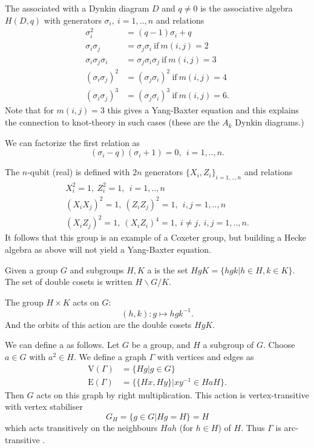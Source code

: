 \documentclass[12pt]{article}
\begin{document}
The  associated with a Dynkin diagram $D$
and $q\ne 0$ 
is the associative algebra $H(D,q)$ with
generators $\sigma_i,\ i=1,..,n$ and relations
\begin{align*}
\sigma_i^2 &= (q-1)\sigma_i + q \\
\sigma_i \sigma_j &= \sigma_j \sigma_i \ \mbox{if}\ m(i,j)=2 \\
\sigma_i \sigma_j \sigma_i &= \sigma_j \sigma_i \sigma_j \ \mbox{if}\ m(i,j)=3 \\
(\sigma_i \sigma_j)^2 &= (\sigma_j \sigma_i)^2 \ \mbox{if}\ m(i,j)=4 \\
(\sigma_i \sigma_j)^3 &= (\sigma_j \sigma_i)^3 \ \mbox{if}\ m(i,j)=6.
\end{align*}
Note that for $m(i,j)=3$ this gives a Yang-Baxter equation and this
explains the connection to knot-theory in such cases (these are the $A_k$ Dynkin diagrams.)

We can factorize the first relation as
$$
    (\sigma_i - q)(\sigma_i + 1) = 0, \ \ i=1,..,n.
$$

The $n$-qubit (real)  is defined with
$2n$ generators $\{X_i, Z_i\}_{i=1,..,n}$
and relations
\begin{align*}
    X_i^2 = 1,       \ Z_i^2 = 1,\ \ i=1,..,n\\
    (X_i X_j)^2 = 1, \ (Z_i Z_j)^2 = 1,\ \ i,j=1,..,n\\
    (X_i Z_j)^2 = 1, \ (X_i Z_i)^4 = 1, \ i\ne j,\ i,j=1,..,n.
\end{align*}
It follows that this group is an example of a Coxeter group,
but building a Hecke algebra as above will not yield a 
Yang-Baxter equation.


Given a group $G$ and subgroups $H, K$ a
is the set $HgK=\{hgk | h\in H, k\in K\}.$
The set of double cosets is written $H\backslash G/K.$

%

The group $H\times K$ acts on $G:$ 
$$
    (h, k) : g \mapsto hgk^{-1}.
$$
And the orbits of this action are the double cosets $HgK.$

We can define a  as follows.
Let $G$ be a group, and $H$ a subgroup of $G.$
Choose $a\in G$ with $a^2\in H.$
We define a graph $\Gamma$
with vertices and edges as
\begin{align*}
    \mbox{V}(\Gamma) &= \{ Hg | g\in G\} \\
    \mbox{E}(\Gamma) &= \{ \{Hx, Hy\} | xy^{-1}\in HaH\}.
\end{align*}
Then $G$ acts on this graph by right multiplication.
This action is vertex-transitive with vertex stabiliser
$$
G_H = \{g \in G | Hg = H\} = H
$$
which acts
transitively on the neighbours $Hah$ (for $h \in H$) of $H$.
Thus $\Gamma$ is arc-transitive \cite{Sabidussi1964}.
\end{document}
